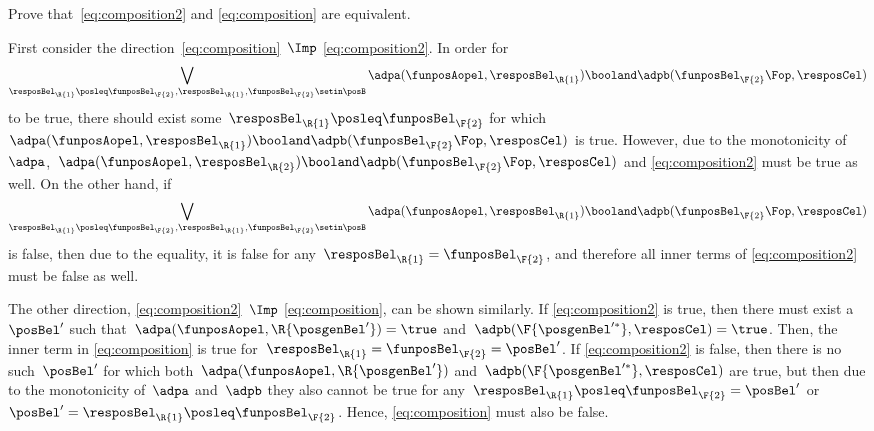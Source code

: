 \begin{exercise}
    \label{ex:composition_equivalency}
    Prove that~\cref{eq:composition2} and \cref{eq:composition} are equivalent.
\end{exercise}
%
\begin{solution}
    First consider the direction~\cref{eq:composition}~$\Imp$ \cref{eq:composition2}.
    In order for%
    \begin{equation}
        \bigvee_{\resposBel_\R{1}\posleq\funposBel_\F{2}, \resposBel_\R{1},\funposBel_\F{2}\setin \posB} \adpa(\funposAopel,\resposBel_\R{1}) \booland \adpb(\funposBel_\F{2}\Fop,\resposCel)%
    \end{equation}
    to be true, there should exist some~$\resposBel_\R{1}\posleq \funposBel_\F{2}$ for which~$\adpa(\funposAopel,\resposBel_\R{1}) \booland\adpb(\funposBel_\F{2}\Fop,\resposCel)$ is true.
    However, due to the monotonicity of~$\adpa$,~$\adpa(\funposAopel,\resposBel_\R{2}) \booland \adpb(\funposBel_\F{2}\Fop,\resposCel)$ and \cref{eq:composition2} must be true as well.
    On the other hand, if%
    \begin{equation}
        \bigvee_{\resposBel_\R{1}\posleq\funposBel_\F{2}, \resposBel_\R{1},\funposBel_\F{2}\setin \posB} \adpa(\funposAopel,\resposBel_\R{1}) \booland \adpb(\funposBel_\F{2}\Fop,\resposCel)%
    \end{equation}
    is false, then due to the equality, it is false for any~$\resposBel_\R{1}=\funposBel_\F{2}$, and therefore all inner terms of \cref{eq:composition2} must be false as well.

    The other direction, \cref{eq:composition2}~$\Imp$ \cref{eq:composition}, can be shown similarly.
    If \cref{eq:composition2} is true, then there must exist a~$\posBel'$ such that~$\adpa(\funposAopel, \R{\posgenBel'})=\true$ and~$\adpb(\F{\posgenBel'^*}, \resposCel)=\true$.
    Then, the inner term in \cref{eq:composition} is true for~$\resposBel_\R{1}=\funposBel_\F{2}=\posBel'$.
    If \cref{eq:composition2} is false, then there is no such~$\posBel'$ for which both~$\adpa(\funposAopel, \R{\posgenBel'})$ and~$\adpb(\F{\posgenBel'^*}, \resposCel)$ are true, but then due to the monotonicity of~$\adpa$ and~$\adpb$ they also cannot be true for any~$\resposBel_\R{1} \posleq \funposBel_\F{2} = \posBel'$ or~$\posBel'=\resposBel_\R{1} \posleq \funposBel_\F{2}$.
    Hence, \cref{eq:composition} must also be false.
\end{solution}

